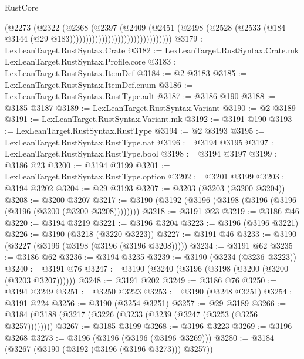 \begin{lexlean}{RustCore}
\begin{coremodule}
                                              (@2273
                                                (@2322
                                                  (@2368
                                                    (@2397
                                                      (@2409
                                                        (@2451
                                                          (@2498
                                                            (@2528
                                                              (@2533
                                                                (@184
                                                                  @3144
                                                                  (@29
                                                                    @183))))))))))))))))))))))))))))))))
@3179 := LexLeanTarget.RustSyntax.Crate
@3182 := LexLeanTarget.RustSyntax.Crate.mk LexLeanTarget.RustSyntax.Profile.core
@3183 := LexLeanTarget.RustSyntax.ItemDef
@3184 := @2 @3183
@3185 := LexLeanTarget.RustSyntax.ItemDef.enum
@3186 := LexLeanTarget.RustSyntax.RustType.adt
@3187 := @3186 @190
@3188 := @3185 @3187
@3189 := LexLeanTarget.RustSyntax.Variant
@3190 := @2 @3189
@3191 := LexLeanTarget.RustSyntax.Variant.mk
@3192 := @3191 @190
@3193 := LexLeanTarget.RustSyntax.RustType
@3194 := @2 @3193
@3195 := LexLeanTarget.RustSyntax.RustType.nat
@3196 := @3194 @3195
@3197 := LexLeanTarget.RustSyntax.RustType.bool
@3198 := @3194 @3197
@3199 := @3186 @23
@3200 := @3194 @3199
@3201 := LexLeanTarget.RustSyntax.RustType.option
@3202 := @3201 @3199
@3203 := @3194 @3202
@3204 := @29 @3193
@3207 := @3203 (@3203 (@3200 @3204))
@3208 := @3200 @3207
@3217 := @3190 (@3192 (@3196 (@3198 (@3196 (@3196 (@3196 (@3200 (@3200 @3208))))))))
@3218 := @3191 @23
@3219 := @3186 @46
@3220 := @3194 @3219
@3221 := @3196 @3204
@3223 := @3196 (@3196 @3221)
@3226 := @3190 (@3218 (@3220 @3223))
@3227 := @3191 @46
@3233 := @3190 (@3227 (@3196 (@3198 (@3196 (@3196 @3208)))))
@3234 := @3191 @62
@3235 := @3186 @62
@3236 := @3194 @3235
@3239 := @3190 (@3234 (@3236 @3223))
@3240 := @3191 @76
@3247 := @3190 (@3240 (@3196 (@3198 (@3200 (@3200 (@3203 @3207))))))
@3248 := @3191 @202
@3249 := @3186 @76
@3250 := @3194 @3249
@3251 := @3250 @3223
@3253 := @3190 (@3248 @3251)
@3254 := @3191 @224
@3256 := @3190 (@3254 @3251)
@3257 := @29 @3189
@3266 := @3184 (@3188 (@3217 (@3226 (@3233 (@3239 (@3247 (@3253 (@3256 @3257))))))))
@3267 := @3185 @3199
@3268 := @3196 @3223
@3269 := @3196 @3268
@3273 := @3196 (@3196 (@3196 (@3196 @3269)))
@3280 := @3184 (@3267 (@3190 (@3192 (@3196 (@3196 @3273))) @3257))

\end{coremodule}
\end{lexlean}
